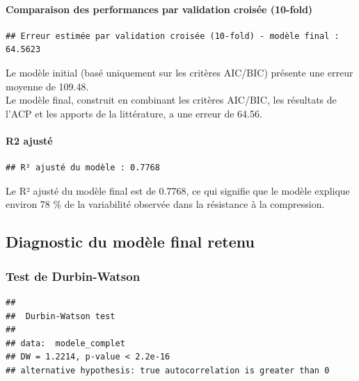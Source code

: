 \documentclass[
  12pt,
]{article}
\begin{document}
\paragraph{Comparaison des performances par validation croisée
(10-fold)}\label{comparaison-des-performances-par-validation-croisuxe9e-10-fold}

\begin{verbatim}
## Erreur estimée par validation croisée (10-fold) - modèle final : 64.5623
\end{verbatim}

Le modèle initial (basé uniquement sur les critères AIC/BIC) présente
une erreur moyenne de 109.48.\\
Le modèle final, construit en combinant les critères AIC/BIC, les
résultats de l'ACP et les apports de la littérature, a une erreur de
64.56.

\paragraph{R2 ajusté}\label{r2-ajustuxe9}

\begin{verbatim}
## R² ajusté du modèle : 0.7768
\end{verbatim}

Le R² ajusté du modèle final est de 0.7768, ce qui signifie que le
modèle explique environ 78 \% de la variabilité observée dans la
résistance à la compression.

\subsection{Diagnostic du modèle final
retenu}\label{diagnostic-du-moduxe8le-final-retenu}

\subsubsection{Test de Durbin-Watson}\label{test-de-durbin-watson}

\begin{verbatim}
## 
##  Durbin-Watson test
## 
## data:  modele_complet
## DW = 1.2214, p-value < 2.2e-16
## alternative hypothesis: true autocorrelation is greater than 0
\end{verbatim}
\end{document}
